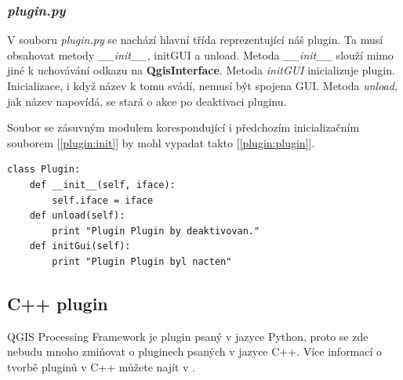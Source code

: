 \subsubsection*{\textit{plugin.py}}
V souboru \textit{plugin.py} se nachází hlavní třída reprezentující náš plugin. Ta musí obsahovat metody \textit{\_\_init\_\_}, initGUI a unload. Metoda \textit{\_\_init\_\_} slouží mimo jiné k uchovávání odkazu na \textbf{QgisInterface}. Metoda \textit{initGUI} inicializuje plugin. Inicializace, i když název k tomu svádí, nemusí být spojena GUI. Metoda \textit{unload}, jak název napovídá, se stará o akce po deaktivaci pluginu. 

\newpage
Soubor se zásuvným modulem korespondující i předchozím inicializačním souborem [\autoref{plugin:init}] by mohl vypadat takto [\autoref{plugin:plugin}]. \\

\begin{lstlisting}[caption={plugin.py - plugin},label=plugin:plugin]
class Plugin:
    def __init__(self, iface):
        self.iface = iface
    def unload(self):
        print "Plugin Plugin by deaktivovan."
    def initGui(self):
		print "Plugin Plugin byl nacten"
\end{lstlisting}

\subsection{C++ plugin}
QGIS Processing Framework je plugin psaný v jazyce Python, proto se zde nebudu mnoho zmiňovat o pluginech psaných v jazyce C++. Více informací o tvorbě pluginů v C++ můžete najít v  .
% 



